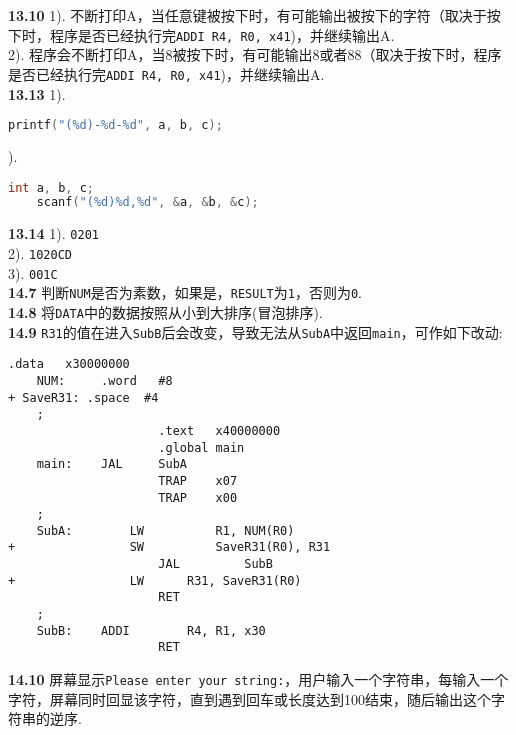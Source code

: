 ﻿\documentclass[UTF8]{ctexart}
\begin{document}
\noindent\textbf{13.10} 1). 不断打印A，当任意键被按下时，有可能输出被按下的字符（取决于按下时，程序是否已经执行完\texttt{ADDI R4, R0, x41})，并继续输出A.\\
2). 程序会不断打印A，当8被按下时，有可能输出8或者88（取决于按下时，程序是否已经执行完\texttt{ADDI R4, R0, x41})，并继续输出A.\\

\noindent\textbf{13.13} 1).
\begin{lstlisting}[language=C, numbers = none]
    printf("(%d)-%d-%d", a, b, c);
\end{lstlisting}
).
\begin{lstlisting}[language=C, numbers = none]
    int a, b, c;
    scanf("(%d)%d,%d", &a, &b, &c);
\end{lstlisting}

\noindent\textbf{13.14} 1). \texttt{0201\textvisiblespace}\\
2). \texttt{1020CD}\\
3). \texttt{001C}\\

\noindent\textbf{14.7} 判断\texttt{NUM}是否为素数，如果是，\texttt{RESULT}为\texttt{1}，否则为\texttt{0}.\\

\noindent\textbf{14.8} 将\texttt{DATA}中的数据按照从小到大排序(冒泡排序).\\

\noindent\textbf{14.9} \texttt{R31}的值在进入\texttt{SubB}后会改变，导致无法从\texttt{SubA}中返回\texttt{main}，可作如下改动:
\begin{lstlisting}[numbers = none, tabsize = 2]
	         .data   x30000000
	NUM:     .word   #8
+ SaveR31: .space  #4
	;
					 .text   x40000000
					 .global main
	main:    JAL     SubA
					 TRAP    x07
					 TRAP    x00
	;
	SubA:		 LW			 R1, NUM(R0)
+ 				 SW			 SaveR31(R0), R31
					 JAL		 SubB
+ 				 LW      R31, SaveR31(R0)
					 RET
	;
	SubB:    ADDI		 R4, R1, x30
					 RET
\end{lstlisting}

\noindent\textbf{14.10} 屏幕显示\texttt{Please enter your string:}，用户输入一个字符串，每输入一个字符，屏幕同时回显该字符，直到遇到回车或长度达到100结束，随后输出这个字符串的逆序.\\
\end{document}
